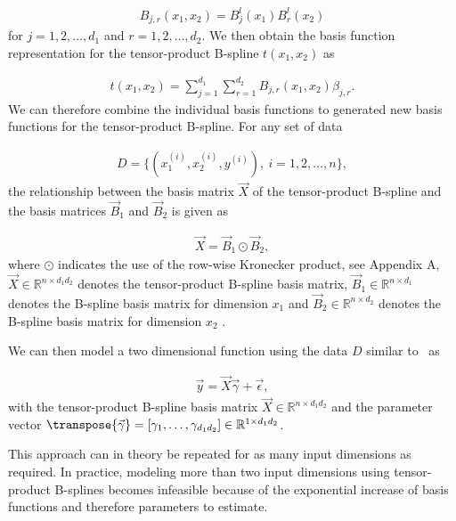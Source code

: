 \begin{align}
	B_{j,r}(x_1, x_2) = B_j^l(x_1) B_r^l(x_2)
\end{align}
%
for $j=1, 2, \dots, d_1$ and $r=1,2,\dots, d_2$. We then obtain the basis function representation for the tensor-product B-spline $t(x_1, x_2)$ as

\begin{align} \label{eq:tps-basis-function-notation}
	t(x_1,x_2) = \sum_{j=1}^{d_1} \sum_{r=1}^{d_2} B_{j,r}(x_1, x_2) \beta_{j,r}. 
\end{align}
%
We can therefore combine the individual basis functions to generated new basis functions for the tensor-product B-spline. For any set of data 

\begin{align}
	D = \{ (x^{(i)}_{1}, x^{(i)}_{2}, y^{(i)} ), \ i=1,2, \dots, n\}, 
\end{align}
%	
the relationship between the basis matrix $\vec{X}$ of the tensor-product B-spline and the basis matrices $\vec{B}_1$ and $\vec{B}_2$ is given as

\begin{align}
	\vec{X} = \vec{B}_1 \odot \vec{B}_2,
\end{align}
%
where $\odot$ indicates the use of the row-wise Kronecker product, see Appendix A, $\vec{X} \in \mathbb{R}^{n \times d_1 d_2}$ denotes the tensor-product B-spline basis matrix, $\vec{B}_1 \in \mathbb{R}^{n \times d_1}$ denotes the B-spline basis matrix for dimension $x_1$ and $\vec{B}_2 \in \mathbb{R}^{n \times d_2}$ denotes the B-spline basis matrix for dimension $x_2$ \cite{fahrmeir2007regression}.  

We can then model a two dimensional function using the data $D$ similar to~ as

\begin{align} \label{eq:tps-matrix-notation}
	\vec{y} = \vec{X} \vec{\gamma} + \vec{\epsilon},
\end{align}
%
with the tensor-product B-spline basis matrix $\vec{X} \in \mathbb{R}^{n \times d_1 d_2}$ and the parameter vector $\transpose{\vec{\gamma}} = [\gamma_1, \dots, \gamma_{d_1 d_2}] \in \mathbb{R}^{1 \times d_1 d_2}$. 

This approach can in theory be repeated for as many input dimensions as required. In practice, modeling more than two input dimensions using tensor-product B-splines becomes infeasible because of the exponential increase of basis functions and therefore parameters to estimate. 


